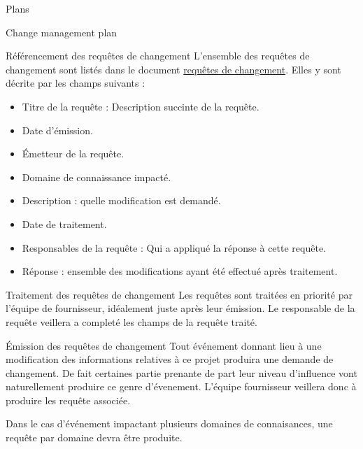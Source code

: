 \documentclass[]{article}
\begin{document}
\begin{section}{Plans}
 \begin{subsection}{Change management plan}
    \begin{subsubsection}{Référencement des requêtes de changement}
        L'ensemble des requêtes de changement sont listés dans le document \href{./documents/Requête_de_changements.pdf}{requêtes de changement}.
        Elles y sont décrite par les champs suivants : 
        \begin{itemize}
            \item Titre de la requête : Description succinte de la requête.
            \item Date d'émission.
            \item Émetteur de la requête.
            \item Domaine de connaissance impacté.
            \item Description : quelle modification est demandé.
            \item Date de traitement.
            \item Responsables de la requête : Qui a appliqué la réponse à cette requête.
            \item Réponse : ensemble des modifications ayant été effectué après traitement.
        \end{itemize}
    \end{subsubsection}

    \begin{subsubsection}{Traitement des requêtes de changement}
        Les requêtes sont traitées en priorité par l'équipe de fournisseur, idéalement juste après leur émission.
        Le responsable de la requête veillera a completé les champs de la requête traité.
    \end{subsubsection}

    \begin{subsubsection}{Émission des requêtes de changement}
        Tout événement donnant lieu à une modification des informations relatives à ce projet produira une demande de changement.
        De fait certaines partie prenante de part leur niveau d'influence vont naturellement produire ce genre d'évenement.
        L'équipe fournisseur veillera donc à produire les requête associée.

        Dans le cas d'événement impactant plusieurs domaines de connaisances, une requête par domaine devra être produite.
    \end{subsubsection}
 \end{subsection}


\end{section}
\end{document}
